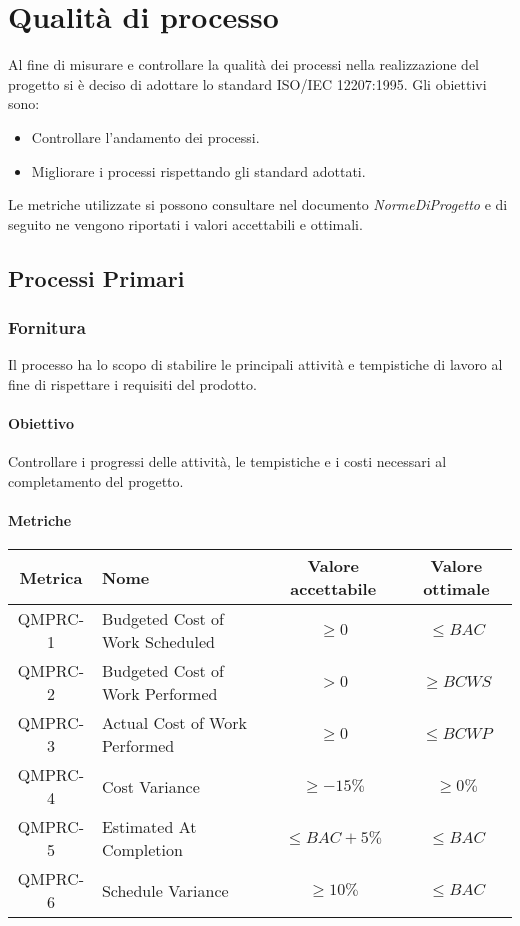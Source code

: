 \section{Qualità di processo}
Al fine di misurare e controllare la qualità dei processi nella realizzazione del progetto si è deciso di 
adottare lo standard ISO/IEC 12207:1995.
Gli obiettivi sono:
\begin{itemize}
    \item Controllare l'andamento dei processi.
    \item Migliorare i processi rispettando gli standard adottati.
\end{itemize}
Le metriche utilizzate si possono consultare nel documento \emph{NormeDiProgetto} e di
seguito ne vengono riportati i valori accettabili e ottimali.

\subsection{Processi Primari}
\subsubsection{Fornitura}
Il processo ha lo scopo di stabilire le principali attività e tempistiche di lavoro
al fine di rispettare i requisiti del prodotto.

\paragraph{Obiettivo}
Controllare i progressi delle attività, le tempistiche e i costi necessari al completamento del progetto.

\paragraph{Metriche}
\begin{center}
    \renewcommand{\arraystretch}{1.8}
    \begin{tabular}{ |c|m{12em}|c|c|}
        \hline
        \textbf{Metrica} & \textbf{Nome} & \textbf{Valore accettabile} & \textbf{Valore ottimale} \\
        \hline
        QMPRC-1 & Budgeted Cost of \newline Work Scheduled & $ \geq 0 $ & $ \leq BAC $ \\
        \hline
        QMPRC-2 & Budgeted Cost of Work \newline Performed & $ > 0 $ & $ \geq BCWS $ \\
        \hline
        QMPRC-3 & Actual Cost of Work \newline Performed & $ \geq 0 $ & $ \leq BCWP $ \\
        \hline
        QMPRC-4 & Cost Variance & $ \geq -15\% $ & $ \geq 0\% $ \\
        \hline
        QMPRC-5 & Estimated At Completion & $ \leq BAC + 5\% $ & $ \leq BAC $ \\
        \hline
        QMPRC-6 & Schedule Variance & $ \geq 10\% $ & $ \leq BAC $ \\
        \hline
    \end{tabular}
\end{center}

